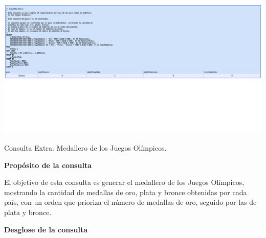 \begin{center}
    \includegraphics[width=16.5cm]{resources/ConsultaExtra.jpeg} 
    
   Consulta Extra. Medallero de los Juegos Olímpicos.
\end{center}

\textbf{Propósito de la consulta}

El objetivo de esta consulta es generar el medallero de los Juegos Olímpicos, mostrando la cantidad de medallas de oro, plata y bronce obtenidas por cada país, con un orden que prioriza el número de medallas de oro, seguido por las de plata y bronce.

\textbf{Desglose de la consulta}

